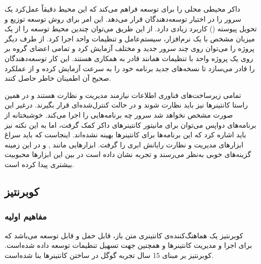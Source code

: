 داکر محیطی محلی را برای توسعه فراهم می‌کند که این محیط دقیقاً عمل‌کرد یک سرور را در اختیار توسعه‌دهندگان قرار می‌دهد. این امر برای روش توسعه توزیع و تحویل پیوسته () کاربرد زیادی دارد. از این طریق می‌توان چندین محیط توسعه را از یک میزبان مشخص با یک نرم‌افزار، سیستم‌عامل و تنظیمات واحد اجرا کرد. از طرف دیگر پروژه‌ را می‌توان روی چند سرور جدید و مختلف آزمایش کرد و تمامی اعضای گروه بر روی یک پروژه‌ واحد با تنظیمات همانند قادر به همکاری هستند. این کار توسعه‌دهندگان را قادر می‌سازد تا نسخه‌های جدید برنامه خود را به سرعت آزمایش کرده و از عملکرد صحیح آن اطمینان خاطر حاصل کنند.

تمامی زیرساخت‌های فناوری اطلاعات نیازمند مدیریت و نظارت هستند و در همین راستا کانتینرها نیز باید نظارت شوند و در حالت کنترل‌شده‌ای قرار بگیرند. درغیر این‌ صورت مشخص نخواهد شد سرور چه برنامه‌هایی را اجرا می‌کند. خوشبختانه از برنامه‌های دواپس می‌توان برای مانیتور کانتینرهای داکر کمک گرفت، اما به این نکته نیز باید اشاره کرد که این برنامه‌ها برای کانتینرها بهینه‌ نشده‌اند. اینجاست که باید سراغ ابزارهای مدیریت و نظارت رایانش ابری را گرفت. ابزارهایی مانند ,  و  در این زمینه گزینه‌های خوبی به‌نظر می‌رسند و تجربه نشان داده است در بین این ابزارها  محبوبیت بیشتری پیدا کرده است.
\cite{nichols_2018}

\subsection{کوبرنتیز}

\subsubsection{مفاهیم اولیه}

کوبرنتیز یک هماهنگ‌کننده‌ی کانتینری متن باز، قابل حمل و قابل توسعه می‌باشد که برای اجرا و مدیریت کانتینرها و همچنین جهت تسهیل تنظیمات توسعه داده شده‌است. کوبرنتیز بر مبنای 15 سال تجربه گوگل در ساختن کانتینرها بنا شده‌است.

